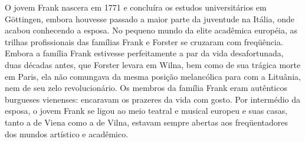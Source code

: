 %

O jovem Frank nascera em 1771 e concluíra os estudos universitários em
Göttingen, embora houvesse passado a maior parte da juventude na Itália,
onde acabou conhecendo a esposa. No pequeno mundo da elite acadêmica
européia, as trilhas profissionais das famílias Frank e Forster se
cruzaram com freqüência. Embora a família Frank estivesse perfeitamente
a par da vida desafortunada, duas décadas antes, que Forster levara em
Wilna, bem como de sua trágica morte em Paris, ela não comungava da
mesma posição melancólica para com a Lituânia, nem de seu zelo
revolucionário. Os membros da família Frank eram autênticos burgueses
vienenses: encaravam os prazeres da vida com gosto. Por intermédio da
esposa, o jovem Frank se ligou ao meio teatral e musical europeu e suas
casas, tanto a de Viena como a de Vilna, estavam sempre abertas aos
freqüentadores dos mundos artístico e acadêmico.

%

